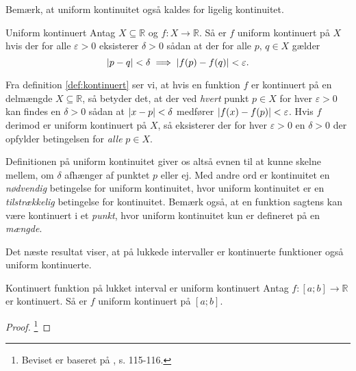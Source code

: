 Bemærk, at uniform kontinuitet også kaldes for ligelig kontinuitet.

\begin{definition}[label=def:uniform_kontinuert]{Uniform kontinuert}{}
  Antag $X \subseteq \mathbb{R}$ og $f:X \to \mathbb{R}$. 
  Så er $f$ uniform kontinuert på $X$ hvis der for alle $\varepsilon >0$ eksisterer $\delta >0$ sådan at der for alle $p,\,q \in X$ gælder
  \[
  \abs{p-q} < \delta \implies \abs{f(p)-f(q)}<\varepsilon .  
  \] 
\end{definition}

Fra definition \ref{def:kontinuert} ser vi, at hvis en funktion $f$ er kontinuert på en delmængde $X \subseteq \mathbb{R}$, så betyder det, at der ved \textit{hvert} punkt $p \in X$ for hver $\varepsilon >0$ kan findes en $\delta >0$ sådan at $\abs{x-p} <\delta $ medfører $\abs{f(x)-f(p)} < \varepsilon  $.
Hvis $f$ derimod er uniform kontinuert på $X$, så eksisterer der for hver $\varepsilon >0$ en $\delta >0$ der opfylder betingelsen for \textit{alle} $p \in X$. 

Definitionen på uniform kontinuitet giver os altså evnen til at kunne skelne mellem, om $\delta $ afhænger af punktet $p$ eller ej. 
Med andre ord er kontinuitet en \textit{nødvendig} betingelse for uniform kontinuitet, hvor uniform kontinuitet er en \textit{tilstrækkelig} betingelse for kontinuitet.
Bemærk også, at en funktion sagtens kan være kontinuert i et \textit{punkt}, hvor uniform kontinuitet kun er defineret på en \textit{mængde}.

Det næste resultat viser, at på lukkede intervaller er kontinuerte funktioner også uniform kontinuerte.

\begin{theorem}[label=theo:kontinuert_uniform]{Kontinuert funktion på lukket interval er uniform kontinuert}{}
  Antag $f:[a;b]\to \mathbb{R}$ er kontinuert. 
  Så er $f$ uniform kontinuert på $[a;b]$.
\end{theorem}
\begin{proof} 
  \footnote{Beviset er baseret på \cite{Clausen1993}, s. 115-116.} 
\end{proof}

